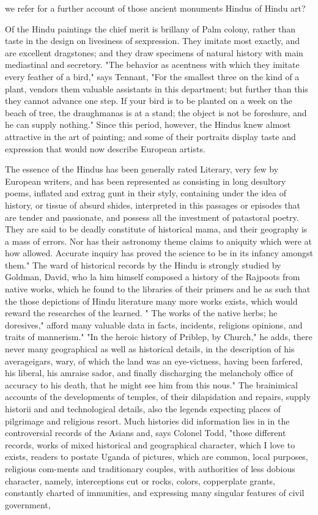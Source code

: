 \documentclass{article}
\begin{document}
we refer for a further account of those ancient monuments Hindus of Hindu art?

Of the Hindu paintings the chief merit is brillany of Palm colony, rather than taste in the design on livesiness of sexpression. They imitate most exactly, and are excellent dragstones; and they draw specimens of natural history with main mediastinal and secretory. "The behavior as acentness with which they imitate every feather of a bird," says Tennant, "For the smallest three on the kind of a plant, vendors them valuable assistants in this department; but further than this they cannot advance one step. If your bird is to be planted on a week on the beach of tree, the draughmanas is at a stand; the object is not be foreshure, and he can supply nothing." Since this period, however, the Hindus knew almost attractive in the art of painting; and some of their portraits display taste and expression that would now describe European artists.

The essence of the Hindus has been generally rated Literary, very few by European writers, and has been represented as consisting in long desultory poems, inflated and extrag gunt in their styly, containing under the idea of history, or tissue of absurd shides, interpreted in this passages or episodes that are tender and passionate, and possess all the investment of patastoral poetry. They are said to be deadly constitute of historical mama, and their geography is a mass of errors. Nor has their astronomy theme claims to aniquity which were at how allowed. Accurate inquiry has proved the science to be in its infancy amongst them." The ward of historical records by the Hindu is strongly studied by Goldman, David, who la him himself composed a history of the Rajpoots from native works, which he found to the libraries of their primers and he as such that the those depictions of Hindu literature many more works exists, which would reward the researches of the learned. " The works of the native herbs; he doresives," afford many valuable data in facts, incidents, religions opinions, and traits of mannerism." "In the heroic history of Priblep, by Church," he adds, there never many geographical as well as historical details, in the description of his averageigars, wary, of which the land was an eye-victness, having been farfered, his liberal, his amraise sador, and finally discharging the melancholy office of accuracy to his death, that he might see him from this nous." The brainimical accounts of the developments of temples, of their dilapidation and repairs, supply historii and and technological details, also the legends expecting places of pilgrimage and religious resort. Much histories did information lies in in the controversial records of the Asians and, says Colonel Todd, "those different records, works of mixed historical and geographical character, which I love to exists, readers to postate Uganda of pictures, which are common, local purposes, religious com-ments and traditionary couples, with authorities of less dobious character, namely, interceptions cut or rocks, colors, copperplate grants, constantly charted of immunities, and expressing many singular features of civil government,
\end{document}
